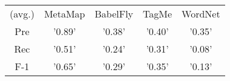 \begin{tabular}{ccccc}
(avg.) & MetaMap & BabelFly & TagMe & WordNet\\ 
Pre & '0.89' & '0.38' & '0.40' & '0.35'\\ 
Rec & '0.51' & '0.24' & '0.31' & '0.08'\\ 
F-1 & '0.65' & '0.29' & '0.35' & '0.13'
\end{tabular}